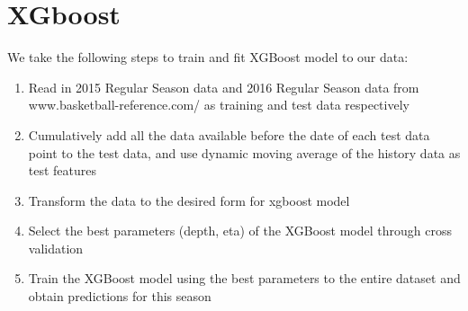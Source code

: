 \section{XGboost}

We take the following steps to train and fit XGBoost model to our data: 
\begin{enumerate}
	\item Read in 2015 Regular Season data and 2016 Regular Season data from 
	    www.basketball-reference.com/ as training and test data respectively
	\item Cumulatively add all the data available before the date of each test
	    data point to the test data, and use dynamic moving average of the 
	    history data as test features
	\item Transform the data to the desired form for xgboost model
	\item Select the best parameters (depth, eta) of the XGBoost model through
	    cross validation
	\item Train the XGBoost model using the best parameters to the entire
	    dataset and obtain predictions for this season
\end{enumerate}

